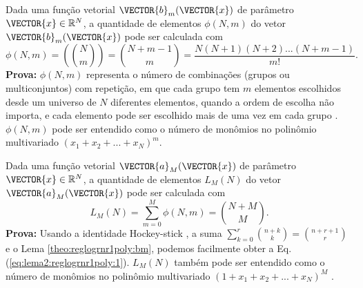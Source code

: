\begin{lema}\label{theo:reglogrnr1poly:bm}
Dada uma função vetorial $\VECTOR{b}_m(\VECTOR{x})$ de parâmetro $\VECTOR{x}\in \mathbb{R}^{N}$,
a quantidade de elementos $\phi(N,m)$ do vetor $\VECTOR{b}_m(\VECTOR{x})$ pode ser calculada com 
\begin{equation}
\phi(N,m)=\left(\!\!{\binom{N}{m}}\!\!\right)=\binom{N+m-1}{m}=\frac{N(N+1)(N+2)...(N+m-1)}{m!}.
\end{equation}
\textbf{Prova:} $\phi(N,m)$ representa o número de combinações 
(grupos ou multiconjuntos) com repetição,
em que cada grupo tem $m$ elementos
escolhidos desde um universo de $N$ diferentes elementos, quando a ordem de escolha não importa, 
e cada elemento pode ser escolhido mais de uma vez em cada grupo \cite[pp. 101,107]{scheinerman2012mathematics}.
$\phi(N,m)$ pode ser entendido como o número de monômios no polinômio multivariado $\left(x_1+x_2+...+x_N\right)^m$.
\end{lema}

\begin{lema}\label{theo:reglogrnr1poly:aM}
Dada uma função vetorial $\VECTOR{a}_M(\VECTOR{x})$ de parâmetro $\VECTOR{x}\in \mathbb{R}^{N}$,
a quantidade de elementos $L_M(N)$ do vetor $\VECTOR{a}_M(\VECTOR{x})$ 
pode ser calculada com \cite[pp. 231]{bortolussi2019computational}
\begin{equation}\label{eq:lema2:reglogrnr1poly:1}
L_M(N)=\sum \limits_{m=0}^{M}\phi(N,m)=\binom{N+M}{M}.
\end{equation}
\textbf{Prova:} Usando a identidade Hockey-stick \cite{detemple2014combinatorial},
a suma $\sum_{k=0}^{r}\binom{n+k}{k}=\binom{n+r+1}{r}$ e o Lema \ref{theo:reglogrnr1poly:bm},
podemos facilmente obter a Eq. (\ref{eq:lema2:reglogrnr1poly:1}).
$L_M(N)$ também pode ser entendido como o número de monômios no polinômio multivariado 
$\left(1+x_1+x_2+...+x_N\right)^M$ \cite[pp. 121]{zippel2012effective}.
\end{lema}
